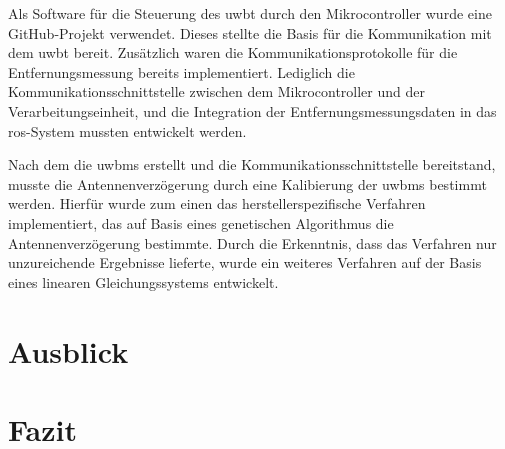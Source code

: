 Als Software für die Steuerung des \gls{uwbt} durch den Mikrocontroller wurde eine GitHub-Projekt verwendet. Dieses stellte die Basis für die Kommunikation mit dem \gls{uwbt} bereit. Zusätzlich waren die Kommunikationsprotokolle für die Entfernungsmessung bereits implementiert. Lediglich die Kommunikationsschnittstelle zwischen dem Mikrocontroller und der Verarbeitungseinheit, und die Integration der Entfernungsmessungsdaten in das \gls{ros}-System mussten entwickelt werden.

Nach dem die \glspl{uwbm} erstellt und die Kommunikationsschnittstelle bereitstand, musste die Antennenverzögerung durch eine Kalibierung der \glspl{uwbm} bestimmt werden. Hierfür wurde zum einen das herstellerspezifische Verfahren implementiert, das auf Basis eines genetischen Algorithmus die Antennenverzögerung bestimmte. Durch die Erkenntnis, dass das Verfahren nur unzureichende Ergebnisse lieferte, wurde ein weiteres Verfahren auf der Basis eines linearen Gleichungssystems entwickelt.










%
%
\section{Ausblick}


%
%
\section{Fazit}

